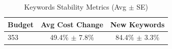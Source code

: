 \begin{table}[htbp]
\centering
\caption{Keywords Stability Metrics (Avg $\pm$ SE)}
\begin{tabular}{lcc}
\toprule
Budget & Avg Cost Change & New Keywords \\
\midrule
353 & 49.4\% $\pm$ 7.8\% & 84.4\% $\pm$ 3.3\% \\
\bottomrule
\end{tabular}
\end{table}
